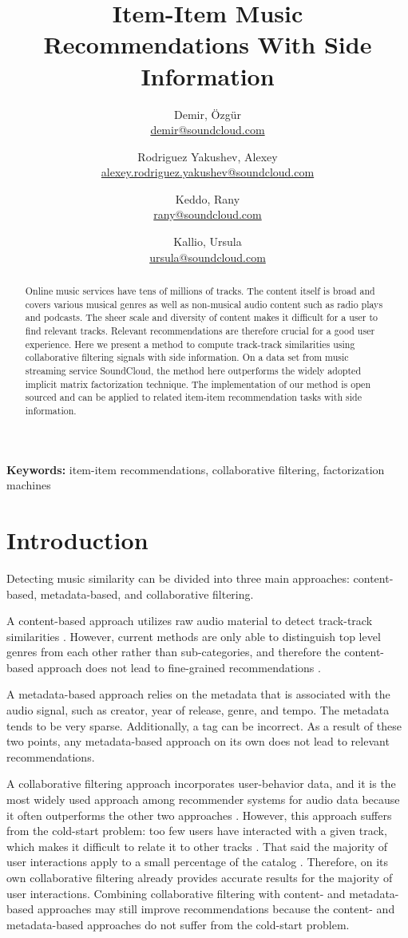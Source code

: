 \documentclass[twocolumn]{article}
\date{}
\author{
  Demir, \"Ozg\"ur \\
  \small{\url{demir@soundcloud.com}}
  \and
  Rodriguez Yakushev, Alexey \\
  \small{\url{alexey.rodriguez.yakushev@soundcloud.com}}
  \and
  Keddo, Rany\\
  \small{\url{rany@soundcloud.com}}
  \and
  Kallio, Ursula \\
  \small{\url{ursula@soundcloud.com}}
}
\title{Item-Item Music Recommendations With Side Information}
\begin{document}
\maketitle
{}
\newpage
{}

\begin{abstract}
Online music services have tens of millions of tracks. The content itself is broad and covers various musical genres as well as non-musical audio content such as radio plays and podcasts. The sheer scale and diversity of content makes it difficult for a user to find relevant tracks. Relevant recommendations are therefore crucial for a good user experience.
Here we present a method to compute track-track similarities using collaborative filtering signals with side information.
On a data set from music streaming service SoundCloud, the method here outperforms the widely adopted implicit matrix factorization technique.
The implementation of our method is open sourced and can be applied to related item-item recommendation tasks with side information.
\end{abstract}

\smallskip
\noindent \textbf{Keywords:} item-item recommendations, collaborative filtering, factorization machines

\section{Introduction}
Detecting music similarity can be divided into three main approaches: content-based, metadata-based, and collaborative filtering.

A content-based approach utilizes raw audio material to detect track-track similarities \cite{content-based}. However, current methods are only able to distinguish top level genres from each other rather than sub-categories, and therefore the content-based approach does not lead to fine-grained recommendations \cite{ismir-2010}.

A metadata-based approach relies on the metadata that is associated with the audio signal, such as creator, year of release, genre, and tempo. The metadata tends to be very sparse. Additionally, a tag can be incorrect. As a result of these two points, any metadata-based approach on its own does not lead to relevant recommendations.

A collaborative filtering approach incorporates user-behavior data, and it is the most widely used approach among recommender systems for audio data because it often outperforms the other two approaches \cite{journals/ieeemm/Slaney11}. However, this approach suffers from the cold-start problem: too few users have interacted with a given track, which makes it difficult to relate it to other tracks \cite{cold-start}. That said the majority of user interactions apply to a small percentage of the catalog \cite{long-tail}. Therefore, on its own collaborative filtering already provides accurate results for the majority of user interactions. Combining collaborative filtering with content- and metadata-based approaches may still improve recommendations because the content- and metadata-based approaches do not suffer from the cold-start problem.
\end{document}
